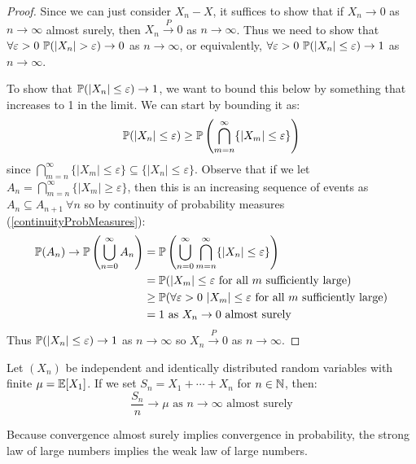 \documentclass[../main.tex]{subfiles}
\begin{document}
\begin{proof}
  Since we can just consider $X_n - X$, it suffices to show that if $X_n \to 0$ as $n \to \infty$ almost surely, then $X_n \xrightarrow{P} 0$ as $n \to \infty$.
  Thus we need to show that $\forall \varepsilon > 0\ \P(|X_n| > \varepsilon) \to 0$ as $n \to \infty$, or equivalently, $\forall \varepsilon > 0\ \P(|X_n| \leq \varepsilon) \to 1$ as $n \to \infty$.

  To show that $\P(|X_n| \leq \varepsilon) \to 1$, we want to bound this below by something that increases to 1 in the limit.
  We can start by bounding it as:
  \[
    \P(|X_n| \leq \varepsilon) \geq \P\left(\bigcap_{m = n}^{\infty} \{|X_m| \leq \varepsilon\}\right)
  \]
  since $\bigcap_{m = n}^{\infty} \{|X_m| \leq \varepsilon \} \subseteq \{|X_n| \leq \varepsilon \}$.
  Observe that if we let $A_n = \bigcap_{m = n}^{\infty} \{|X_m| \geq \varepsilon\}$, then this is an increasing sequence of events as $A_{n} \subseteq A_{n + 1}\ \forall n$ so by continuity of probability measures (\cref{continuityProbMeasures}):
  \begin{align*}
    \P(A_n) \to \P\left(\bigcup_{n = 0}^{\infty} A_n\right) &= \P\left(\bigcup_{n = 0}^{\infty} \bigcap_{m = n}^{\infty} \{|X_n| \leq \varepsilon\}\right) \\
                                                            &= \P(|X_m| \leq \varepsilon \text{ for all $m$ sufficiently large}) \\
                                                            &\geq \P(\forall \varepsilon > 0\ |X_m| \leq \varepsilon \text{ for all $m$ sufficiently large}) \\
                                                            &= 1 \text{ as $X_n \to 0$ almost surely}
  \end{align*}
  Thus $\P(|X_n| \leq \varepsilon) \to 1$ as $n \to \infty$ so $X_n \xrightarrow{P} 0$ as $n \to \infty$.
\end{proof}
\begin{theorem}
  Let $(X_n)$ be independent and identically distributed random variables with finite $\mu = \E[X_1]$.
  If we set $S_n = X_1 + \cdots + X_n$ for $n \in \N$, then: \label{SLLN}
  \[
    \frac{S_n}{n} \to \mu \text{ as } n \to \infty \text{ almost surely}
  \]
\end{theorem}
\begin{remark}
  Because convergence almost surely implies convergence in probability, the strong law of large numbers implies the weak law of large numbers.
\end{remark}
\end{document}
